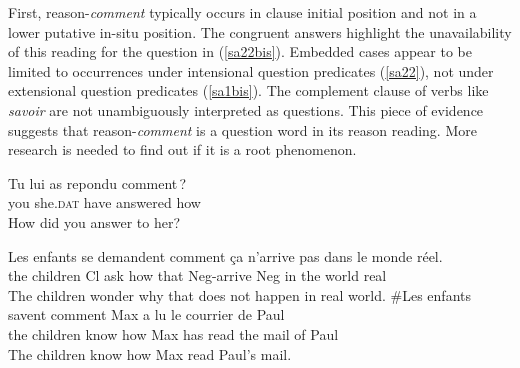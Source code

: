 \documentclass[output=paper,colorlinks,citecolor=brown,
]{langscibook}
\begin{document}
First, reason-\textit{comment\/} typically occurs  in clause initial position
and not in a lower putative in-situ position. The congruent answers highlight the unavailability of this reading for the question   in (\ref{sa22bis}).
Embedded cases appear to be limited to occurrences under intensional question predicates (\ref{sa22}), not under extensional question predicates  (\ref{sa1bis}). The complement clause of verbs like \textit{savoir} are not unambiguously interpreted as questions. This piece of evidence suggests that reason-\textit{comment} is a question word in its reason reading.
More  research is needed to find out if it is a root phenomenon.
\begin{exe}
\ex \label{sa22bis} \gll Tu lui as repondu comment\,? \\
 you she.\textsc{dat} have answered how \\
\glt  How did you answer to her?
\begin{xlist}
\end{xlist}
\ex \label{emb}
\begin{xlist}
\ex \label{sa22} \gll Les enfants se demandent comment \c{c}a n'arrive pas dans le monde r\'eel. \\
the children Cl ask how that Neg-arrive Neg in the world real \\
\glt The children wonder why that does not happen in real world.
\ex\label{sa1bis} \gll  \#Les enfants savent  comment Max a lu le courrier de Paul \\
the children know how Max has read the mail of Paul  \\
\glt The children know how Max read Paul's mail.
\end{xlist}
\end{exe}
\end{document}
